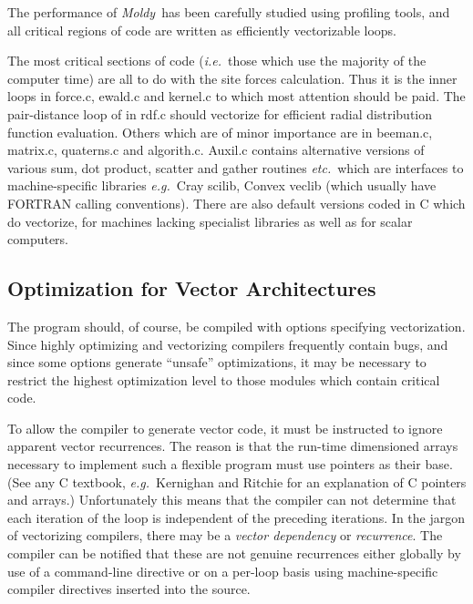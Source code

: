 \documentclass[a4paper,twoside]{report}
\newcommand{\Fname}[1]{{\upshape\mdseries\sffamily#1}}
\newcommand{\moldy}{\emph{Moldy}}
\newcommand{\etc}{\emph{etc.}}
\newcommand{\eg}{\emph{e.g.}}
\newcommand{\ie}{\emph{i.e.}}
\begin{document}
The performance of \moldy\  has been carefully studied using profiling
tools, and all critical regions of code are written as efficiently
vectorizable loops.  

The most critical sections of code (\ie\ those which use the majority
of the computer time) are all to do with the site forces calculation.
Thus it is the inner loops in \Fname{force.c}, \Fname{ewald.c} and
\Fname{kernel.c} to which most attention should be paid.  The
pair-distance loop of  in \Fname{rdf.c} should
vectorize for efficient radial distribution function evaluation.
Others which are of minor importance are in \Fname{beeman.c},
\Fname{matrix.c}, \Fname{quaterns.c} and \Fname{algorith.c}.
\Fname{Auxil.c} contains alternative versions of various sum, dot
product, scatter and gather routines \etc\ which are interfaces to
machine-specific libraries \eg\ Cray scilib, Convex veclib (which
usually have FORTRAN calling conventions). There are also default
versions coded in C which do vectorize, for machines lacking
specialist libraries as well as for scalar computers.

\subsection{Optimization for Vector Architectures}
The program should, of course, be compiled with options specifying
vectorization.   Since highly
optimizing and vectorizing compilers frequently contain bugs, and
since some options generate ``unsafe'' optimizations, it may be
necessary to restrict the highest optimization level to those modules
which contain critical code.

To allow the compiler to generate vector code, it must be instructed
to ignore apparent vector recurrences. The reason is that the run-time
dimensioned arrays necessary to implement such a flexible program must
use pointers as their base.  (See any C textbook, \eg\ Kernighan and
Ritchie\cite[Chapter 5]{kernighan:88} for an explanation of C pointers and
arrays.)  Unfortunately this means that the compiler can not determine
that each iteration of the loop is independent of the preceding
iterations.  In the jargon of vectorizing compilers, there may be a
\emph{vector dependency} or \emph{recurrence}. The compiler can be
notified that these are not genuine recurrences either globally by use
of a command-line directive or on a per-loop basis using
machine-specific compiler directives inserted into the source.
\end{document}
